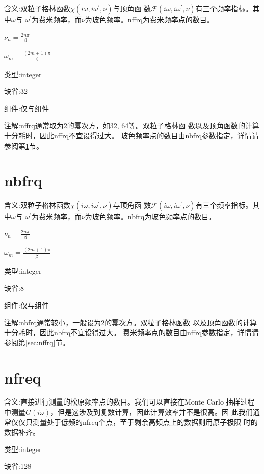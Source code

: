 {\color{red}含义}:双粒子格林函数$\chi(i\omega,i\omega^{\prime},\nu)$与顶角函
数$\mathcal{F}(i\omega,i\omega^{\prime},\nu)$有三个频率指标。其中$\omega$与
$\omega^{\prime}$为费米频率，而$\nu$为玻色频率。nffrq为费米频率点的数目。

$\nu_{n} = \frac{2n\pi}{\beta}$

$\omega_{m} = \frac{(2m + 1)\pi}{\beta}$

{\color{green}类型}:integer

{\color{blue}缺省}:32

{\color{brown}组件}:仅{\gardenia}与{\narcissus}组件

{\color{purple}注解}:nffrq通常取为2的幂次方，如32, 64等。双粒子格林函
数以及顶角函数的计算十分耗时，因此nffrq不宜设得过大。
玻色频率点的数目由nbfrq参数指定，详情请参阅第\ref{sec:nbfrq}节。

\section{nbfrq }
\label{sec:nbfrq}

{\color{red}含义}:双粒子格林函数$\chi(i\omega,i\omega^{\prime},\nu)$与顶角函
数$\mathcal{F}(i\omega,i\omega^{\prime},\nu)$有三个频率指标。其中$\omega$与
$\omega^{\prime}$为费米频率，而$\nu$为玻色频率。nbfrq为玻色频率点的数目。

$\nu_{n} = \frac{2n\pi}{\beta}$

$\omega_{m} = \frac{(2m + 1)\pi}{\beta}$

{\color{green}类型}:integer

{\color{blue}缺省}:8

{\color{brown}组件}:仅{\gardenia}与{\narcissus}组件

{\color{purple}注解}:nbfrq通常较小，一般设为2的幂次方。双粒子格林函数
以及顶角函数的计算十分耗时，因此nbfrq不宜设得过大。
费米频率点的数目由nffrq参数指定，详情请参阅第\ref{sec:nffrq}节。

\section{nfreq }
\label{sec:nfreq}

{\color{red}含义}:直接进行测量的松原频率点的数目。我们可以直接在Monte Carlo
抽样过程中测量$G(i\omega)$，但是这涉及到复数计算，因此计算效率并不是很高。因
此我们通常仅仅只测量处于低频的nfreq个点，至于剩余高频点上的数据则用原子极限
时的数据补齐。

{\color{green}类型}:integer

{\color{blue}缺省}:128


